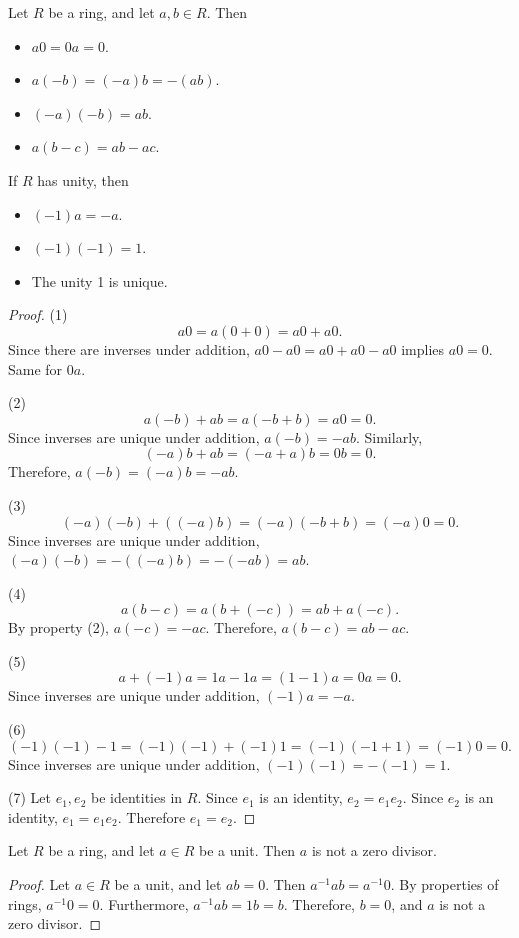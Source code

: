 \begin{theorem}\label{thm:PRG}
	Let $R$ be a ring, and let $a,b\in R$. Then
	\begin{itemize}
		\item $a0=0a=0$.
		\item $a(-b)=(-a)b=-(ab)$.
		\item $(-a)(-b)=ab$.
		\item $a(b-c)=ab-ac$.
	\end{itemize}
	If $R$ has unity, then
	\begin{itemize}
		\item $(-1)a=-a$.
		\item $(-1)(-1)=1$.
		\item The unity 1 is unique.
	\end{itemize}
\end{theorem}
\begin{proof}
	(1)
	\[
		a0=a(0+0)=a0+a0
	.\]
	Since there are inverses under addition, $a0-a0=a0+a0-a0$ implies $a0=0$. Same for $0a$.

	(2)
	\[
		a(-b)+ab=a\left( -b+b \right) =a0=0
	.\]
	Since inverses are unique under addition, $a(-b)=-ab$. Similarly,
	\[
		(-a)b+ab=(-a+a)b=0b=0
	.\]
	Therefore, $a(-b)=(-a)b=-ab$.

	(3)
	\[
		(-a)(-b)+((-a)b)=(-a)(-b+b)=(-a)0=0
	.\]
	Since inverses are unique under addition, $(-a)(-b)=-((-a)b)=-(-ab)=ab$.

	(4)
	\[
		a(b-c)=a(b+(-c))=ab+a(-c)
	.\]
	By property (2), $a(-c)=-ac$. Therefore, $a(b-c)=ab-ac$.

	(5)
	\[
		a+(-1)a=1a-1a=(1-1)a=0a=0
	.\]
	Since inverses are unique under addition, $(-1)a=-a$.

	(6)
	\[
		(-1)(-1)-1=(-1)(-1)+(-1)1=(-1)(-1+1)=(-1)0=0
	.\]
	Since inverses are unique under addition, $(-1)(-1)=-(-1)=1$.

	(7) Let $e_1,e_2$ be identities in $R$. Since $e_1$ is an identity, $e_2=e_1e_2$. Since $e_2$ is an identity, $e_1=e_1e_2$. Therefore $e_1=e_2$.
\end{proof}
\begin{proposition}
	Let $R$ be a ring, and let $a\in R$ be a unit. Then $a$ is not a zero divisor.
\end{proposition}
\begin{proof}
	Let $a\in R$ be a unit, and let $ab=0$. Then $a^{-1}ab=a^{-1}0$. By properties of rings, $a^{-1}0=0$. Furthermore, $a^{-1}ab=1b=b$. Therefore, $b=0$, and $a$ is not a zero divisor.
\end{proof}
